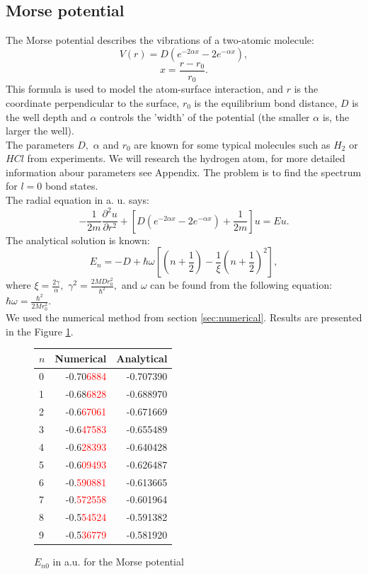 \documentclass[a4paper, 12pt]{article}
\begin{document}
\subsection{Morse potential}
The Morse potential describes the vibrations of a two-atomic molecule:
\begin{equation}
  V(r) = D(e^{-2\alpha x} - 2e^{-\alpha x}), 
\end{equation}
$$x= \frac{r-r_0}{r_0}.$$
This formula is used to model the atom-surface interaction, and  $r$ is the coordinate perpendicular to the surface, $r_0$ is the equilibrium bond distance, $D$ is the well depth and $\alpha$ controls the 'width' of the potential (the smaller $\alpha$ is, the larger the well). \\
The parameters $D,$ $\alpha$ and $r_0$ are known for some typical molecules such as $H_2$ or $H Cl$ from experiments. We will research the hydrogen atom, for more detailed information abour parameters see Appendix. The problem is to find the spectrum for $l=0$ bond states. \\
The radial equation 
 in a. u.  says:
$$-\frac{1}{2m}\frac{\partial^2 u}{\partial r^2}+[D(e^{-2\alpha x} - 2e^{-\alpha x})+\frac{1}{2m}]u = Eu.$$
The analytical solution is known:
$$E_n = -D + \hbar \omega [(n+\frac{1}{2}) - \frac{1}{\xi}(n+\frac{1}{2})^2],$$
where $\xi = \frac{2 \gamma}{\alpha},$ $\gamma^2 = \frac{2 M D r_0^2}{\hbar^2},$ and $\omega$ can be found from the following equation: $\hbar \omega = \frac{\hbar^2}{2 M  r_0^2}.$\\
We used the numerical method from section \ref{sec:numerical}. Results are presented in the Figure \ref{Mor_spectrum}.
\begin{figure}[h!]
\centering
\begin{tabular}{lrr}
\toprule
$n$ &      Numerical & Analytical \\
\midrule
0 & -0.70\textcolor{red}{6884} & -0.707390 \\
1 & -0.68\textcolor{red}{6828} & -0.688970 \\
2 & -0.6\textcolor{red}{67061} & -0.671669 \\
3 & -0.6\textcolor{red}{47583} & -0.655489 \\
4 & -0.6\textcolor{red}{28393} & -0.640428 \\
5 & -0.6\textcolor{red}{09493} & -0.626487 \\
6 & -0.\textcolor{red}{590881} & -0.613665 \\
7 & -0.\textcolor{red}{572558} & -0.601964 \\
8 & -0.5\textcolor{red}{54524} & -0.591382 \\
9 & -0.5\textcolor{red}{36779} & -0.581920 \\
\bottomrule
\end{tabular}
\caption{$E_{n0}$ in a.u. for the Morse potential}
\label{Mor_spectrum}
\end{figure}
\end{document}
